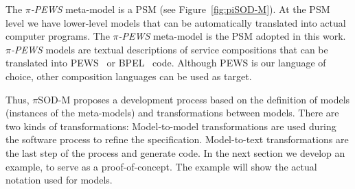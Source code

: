 The \textit{$\pi$-PEWS} meta-model is a PSM (see Figure~\ref{fig:piSOD-M}).
At the PSM level we have lower-level models that can be automatically translated into actual computer programs.
The \textit{$\pi$-PEWS} meta-model is the PSM adopted in this work.
\textit{$\pi$-PEWS} models are textual descriptions of service compositions that can be translated into PEWS~\cite{BaCAM05,Placido2010LTPD} or BPEL~\cite{bpel03} code.
Although PEWS is our language of choice, other composition languages can be used as target.





%
Thus, $\pi$SOD-M proposes a development process based on the definition of models
(instances of the meta-models) and transformations between models.
There are two kinds of transformations:
Model-to-model transformations are used during the software process to refine the specification.
Model-to-text transformations are the last step of the process and generate code.
In the next section we develop an example, to serve as a proof-of-concept.
The example will show the actual notation used for models. 





